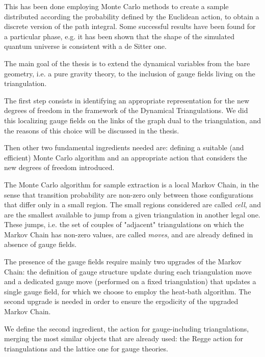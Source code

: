 This has been done employing Monte Carlo methods to create a sample distributed
according the probability defined by the Euclidean action, to obtain a discrete
version of the path integral. Some successful results have been found for a
particular phase, e.g. it has been shown that the shape of the simulated
quantum universe is consistent with a de Sitter one.
\newline

The main goal of the thesis is to extend the dynamical variables from the bare
geometry, i.e. a pure gravity theory, to the inclusion of gauge fields living
on the triangulation.
\newline

The first step consists in identifying an appropriate representation for the
new degrees of freedom in the framework of the Dynamical Triangulations. We
did this localizing gauge fields on the links of the graph dual to the
triangulation, and the reasons of this choice will be discussed in the thesis.

Then other two fundamental ingredients needed are: defining a suitable (and
efficient) Monte Carlo algorithm and an appropriate action that considers the
new degrees of freedom introduced.
\newline

The Monte Carlo algorithm for sample extraction is a local Markov Chain, in
the sense that transition probability are non-zero only between those
configurations that differ only in a small region.
The small regions considered are called \textit{cell}, and are the smallest
available to jump from a given triangulation in another legal one. These jumps,
i.e. the set of couples of "adjacent" triangulations on which the Markov Chain
has non-zero values, are called \textit{moves}, and are already defined in
absence of gauge fields.

The presence of the gauge fields require mainly two upgrades of the Markov
Chain: the definition of gauge structure update during each triangulation move
and a dedicated gauge move (performed on a fixed triangulation) that updates a
single gauge field, for which we choose to employ the heat-bath algorithm.
The second upgrade is needed in order to ensure the ergodicity of the upgraded
Markov Chain.
\newline

We define the second ingredient, the action for gauge-including triangulations,
merging the most similar objects that are already used: the Regge action for
triangulations and the lattice one for gauge theories.

